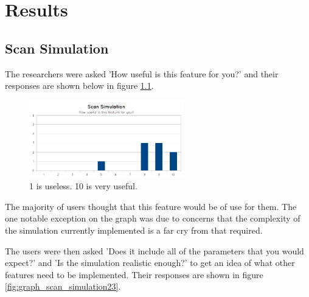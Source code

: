 \chapter{Results}


\section{Scan Simulation}\label{results:scan_simulation}
The researchers were asked 'How useful is this feature for you?' and their responses are shown below in figure \ref{fig:graph_scansimulation_1}.

\begin{figure}[h]
    \centering
	\includegraphics[width=0.6\textwidth]{images/evaluation/graph_scan_simulation_1.png}
    \caption{1 is useless. 10 is very useful.}\label{fig:graph_scansimulation_1}
\end{figure}

The majority of users thought that this feature would be of use for them. The one notable exception on the graph was due to concerns that the complexity of the simulation currently implemented is a far cry from that required.

The users were then asked 'Does it include all of the parameters that you would expect?' and 'Is the simulation realistic enough?' to get an idea of what other features need to be implemented. Their responses are shown in figure \ref{fig:graph_scan_simulation23}.

